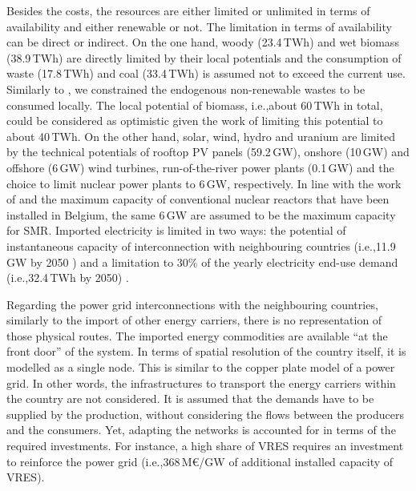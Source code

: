 \documentclass[11pt,twoside,a4paper,english]{article}
\def\ie{i.e.,}
\begin{document}
\begin{appendices}
Besides the costs, the resources are either limited or unlimited in terms of availability and either renewable or not. The limitation in terms of availability can be direct or indirect. On the one hand, woody (23.4\,TWh) and wet biomass (38.9\,TWh) are directly limited by their local potentials and the consumption of waste (17.8\,TWh) and coal (33.4\,TWh) is assumed not to exceed the current use. Similarly to \citet{limpens2021generating}, we constrained the endogenous non-renewable wastes to be consumed locally. The local potential of biomass, \ie about 60\,TWh in total, could be considered as optimistic given the work of \citet{colla2024navigating} limiting this potential to about 40\,TWh. On the other hand, solar, wind, hydro and uranium are limited by the technical potentials of rooftop \gls{PV} panels (59.2\,GW), onshore (10\,GW) and offshore (6\,GW) wind turbines, run-of-the-river power plants (0.1\,GW) and the choice to limit nuclear power plants to 6\,GW, respectively. In line with the work of \citet{PATHS2050} and the maximum capacity of conventional nuclear reactors that have been installed in Belgium, the same 6\,GW are assumed to be the maximum capacity for \gls{SMR}. Imported electricity is limited in two ways: the potential of instantaneous capacity of interconnection with neighbouring countries (\ie 11.9\,GW by 2050 \cite{ELIA_2050}) and a limitation to 30\% of the yearly electricity end-use demand (\ie 32.4\,TWh by 2050) \cite{limpens2021generating}. 

Regarding the power grid interconnections with the neighbouring countries, similarly to the import of other energy carriers, there is no representation of those physical routes. The imported energy commodities are available ``at the front door'' of the system.  In terms of spatial resolution of the country itself, it is modelled as a single node. This is similar to the copper plate model of a power grid. In other words, the infrastructures to transport the energy carriers within the country are not considered.  It is assumed that the demands have to be supplied by the production, without considering the flows between the producers and the consumers. Yet, adapting the networks is accounted for in terms of the required investments. For instance, a high share of VRES requires an investment to reinforce the power grid (\ie 368\,M€/GW of additional installed capacity of \gls{VRES}). 


\end{appendices}
\end{document}
